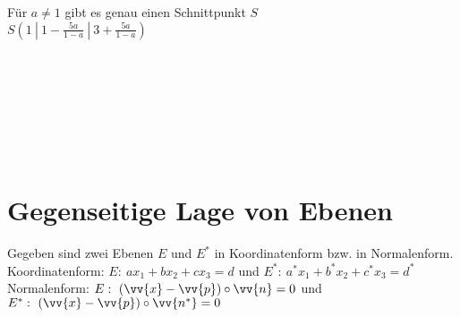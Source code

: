 
Für $a \neq 1$ gibt es genau einen Schnittpunkt $S$ \\
$S\left(1 \ | \ 1 - \frac{5a}{1-a} \ | \ 3 + \frac{5a}{1-a}\right)$

\ \\
\ \\
\ \\
\ \\
\ \\ 
\ \\

\section{Gegenseitige Lage von Ebenen}

Gegeben sind zwei Ebenen $E$ und $E^*$ in Koordinatenform bzw. in Normalenform. \\
Koordinatenform: $E: \  ax_1 + bx_2 + cx_3 = d$ und $E^*: \  a^*x_1 + b^*x_2 + c^*x_3 = d^*$ \\
Normalenform: $E: \ (\vv{x} - \vv{p}) \circ \vv{n} = 0$ und $E^*: \ (\vv{x} - \vv{p}) \circ \vv{n^*} = 0$ 

